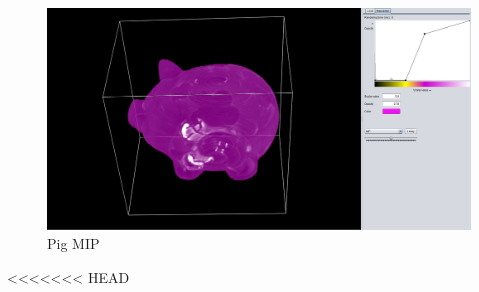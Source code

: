 \documentclass[a4paper,twoside,11pt]{article}
\begin{document}
\newpage

\begin{figure}[h!]
    \includegraphics[width=\textwidth]{SanderImages/PigMIP2.png}
    \caption{Pig MIP}
    \label{fig:PigMIP}
\end{figure}
<<<<<<< HEAD
\end{document}
